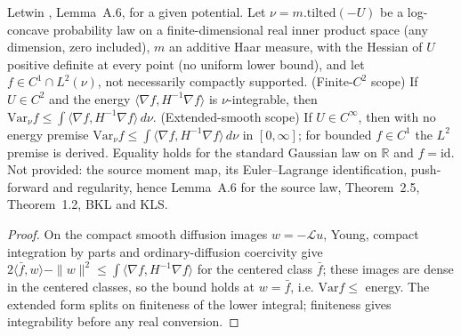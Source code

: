 \begin{theorem}
  \label{thm:letwin-scalar-brascamp-lieb}
  \leanok
  Letwin \cite{Letwin2026QuadraticKLS}, Lemma~A.6, for a given potential.  Let $\nu=m.\mathrm{tilted}(-U)$ be a log-concave
  probability law on a finite-dimensional real inner product space (any dimension, zero included), $m$ an additive Haar
  measure, with the Hessian of $U$ positive definite at every point (no uniform lower bound), and let $f\in C^1\cap L^2(\nu)$,
  not necessarily compactly supported.  (Finite-$C^2$ scope) If $U\in C^2$ and the energy
  $\langle\nabla f,H^{-1}\nabla f\rangle$ is $\nu$-integrable, then $\mathrm{Var}_\nu f\le\int\langle\nabla f,H^{-1}\nabla
  f\rangle\,d\nu$.  (Extended-smooth scope) If $U\in C^\infty$, then with no energy premise
  $\mathrm{Var}_\nu f\le\int\langle\nabla f,H^{-1}\nabla f\rangle\,d\nu$ in $[0,\infty]$; for bounded $f\in C^1$ the $L^2$
  premise is derived.  Equality holds for the standard Gaussian law on $\mathbb R$ and $f=\mathrm{id}$.  Not
  provided: the source moment map, its Euler--Lagrange identification, push-forward and regularity, hence Lemma~A.6 for the
  source law, Theorem~2.5, Theorem~1.2, BKL and KLS.
\end{theorem}
\begin{proof}
  \leanok
  On the compact smooth diffusion images $w=-\mathcal Lu$, Young, compact integration by parts and ordinary-diffusion
  coercivity give $2\langle\bar f,w\rangle-\|w\|^2\le\int\langle\nabla f,H^{-1}\nabla f\rangle$ for the centered class
  $\bar f$; these images are dense in the centered classes, so the bound holds at $w=\bar f$, i.e. $\mathrm{Var}f\le$ energy.
  The extended form splits on finiteness of the lower integral; finiteness gives integrability before any real conversion.
\end{proof}

